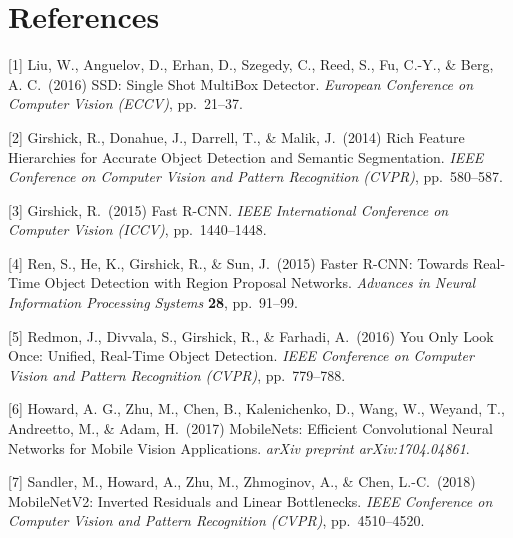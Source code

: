 \documentclass{article}
\begin{document}

\section*{References}

%   
%   
%

{
\small

[1] \label{ref:ssd}
Liu, W., Anguelov, D., Erhan, D., Szegedy, C., Reed, S., Fu, C.-Y., \& Berg, A. C.\ (2016)
SSD: Single Shot MultiBox Detector.
\textit{European Conference on Computer Vision (ECCV)},
pp.\ 21--37.

[2] \label{ref:rcnn}
Girshick, R., Donahue, J., Darrell, T., \& Malik, J.\ (2014)
Rich Feature Hierarchies for Accurate Object Detection and Semantic Segmentation.
\textit{IEEE Conference on Computer Vision and Pattern Recognition (CVPR)},
pp.\ 580--587.

[3] \label{ref:fast_rcnn}
Girshick, R.\ (2015)
Fast R-CNN.
\textit{IEEE International Conference on Computer Vision (ICCV)},
pp.\ 1440--1448.

[4] \label{ref:faster_rcnn}
Ren, S., He, K., Girshick, R., \& Sun, J.\ (2015)
Faster R-CNN: Towards Real-Time Object Detection with Region Proposal Networks.
\textit{Advances in Neural Information Processing Systems} \textbf{28},
pp.\ 91--99.

[5] \label{ref:yolo}
Redmon, J., Divvala, S., Girshick, R., \& Farhadi, A.\ (2016)
You Only Look Once: Unified, Real-Time Object Detection.
\textit{IEEE Conference on Computer Vision and Pattern Recognition (CVPR)},
pp.\ 779--788.

[6] \label{ref:mobilenet}
Howard, A. G., Zhu, M., Chen, B., Kalenichenko, D., Wang, W., Weyand, T., Andreetto, M., \& Adam, H.\ (2017)
MobileNets: Efficient Convolutional Neural Networks for Mobile Vision Applications.
\textit{arXiv preprint arXiv:1704.04861}.

[7] \label{ref:mobilenetv2}
Sandler, M., Howard, A., Zhu, M., Zhmoginov, A., \& Chen, L.-C.\ (2018)
MobileNetV2: Inverted Residuals and Linear Bottlenecks.
\textit{IEEE Conference on Computer Vision and Pattern Recognition (CVPR)},
pp.\ 4510--4520.

}
\appendix
\end{document}
